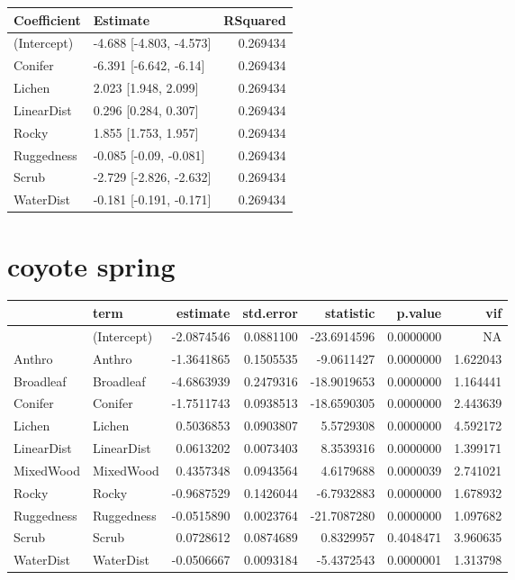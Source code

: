 \documentclass[]{article}
\begin{document}
\begin{tabular}{llr}
\toprule
Coefficient & Estimate & RSquared\\
\midrule
(Intercept) & -4.688 [-4.803, -4.573] & 0.269434\\
Conifer & -6.391 [-6.642, -6.14] & 0.269434\\
Lichen & 2.023 [1.948, 2.099] & 0.269434\\
LinearDist & 0.296 [0.284, 0.307] & 0.269434\\
Rocky & 1.855 [1.753, 1.957] & 0.269434\\
Ruggedness & -0.085 [-0.09, -0.081] & 0.269434\\
Scrub & -2.729 [-2.826, -2.632] & 0.269434\\
WaterDist & -0.181 [-0.191, -0.171] & 0.269434\\
\bottomrule
\end{tabular}

\section{coyote spring}\label{coyote-spring}

\begin{tabular}{llrrrrr}
\toprule
  & term & estimate & std.error & statistic & p.value & vif\\
\midrule
 & (Intercept) & -2.0874546 & 0.0881100 & -23.6914596 & 0.0000000 & NA\\
Anthro & Anthro & -1.3641865 & 0.1505535 & -9.0611427 & 0.0000000 & 1.622043\\
Broadleaf & Broadleaf & -4.6863939 & 0.2479316 & -18.9019653 & 0.0000000 & 1.164441\\
Conifer & Conifer & -1.7511743 & 0.0938513 & -18.6590305 & 0.0000000 & 2.443639\\
Lichen & Lichen & 0.5036853 & 0.0903807 & 5.5729308 & 0.0000000 & 4.592172\\
LinearDist & LinearDist & 0.0613202 & 0.0073403 & 8.3539316 & 0.0000000 & 1.399171\\
MixedWood & MixedWood & 0.4357348 & 0.0943564 & 4.6179688 & 0.0000039 & 2.741021\\
Rocky & Rocky & -0.9687529 & 0.1426044 & -6.7932883 & 0.0000000 & 1.678932\\
Ruggedness & Ruggedness & -0.0515890 & 0.0023764 & -21.7087280 & 0.0000000 & 1.097682\\
Scrub & Scrub & 0.0728612 & 0.0874689 & 0.8329957 & 0.4048471 & 3.960635\\
WaterDist & WaterDist & -0.0506667 & 0.0093184 & -5.4372543 & 0.0000001 & 1.313798\\
\bottomrule
\end{tabular}
\end{document}
